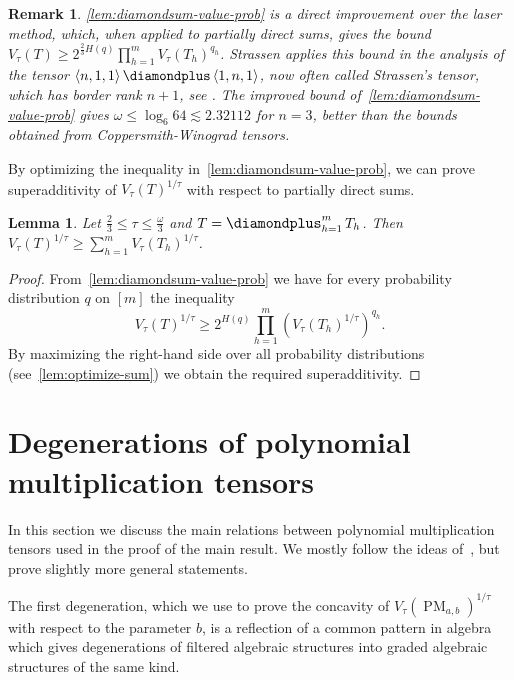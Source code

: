 \documentclass[11pt,letterpaper]{article}
\newtheorem{lemma}[theorem]{Lemma}\AddToHook{env/lemma/begin}{\crefalias{theorem}{lemma}}
\newtheorem{remark}[theorem]{Remark}\AddToHook{env/remark/begin}{\crefalias{theorem}{remark}}
\numberwithin{equation}{section}
\DeclareMathOperator*{\bigdiamondplus}{\scalerel*{\diamondplus}{\bigoplus}}
\DeclareMathOperator{\PM}{PM}
\begin{document}
\begin{remark}\label{rem:laser-comparison}
  \cref{lem:diamondsum-value-prob} is a direct improvement over the laser method, which, when applied to partially direct sums, gives the bound $V_\tau(T) \geq 2^{\frac23 H(q)} \prod_{h = 1}^{m} V_\tau(T_h)^{q_h}$.
  Strassen applies this bound in the analysis of the tensor $\left<n, 1, 1\right> \diamondplus \left<1, n, 1\right>$, now often called Strassen's tensor, which has border rank $n + 1$, see \cite[Lemma~7.4]{Strassen-87}.
  The improved bound of~\cref{lem:diamondsum-value-prob} gives $\omega \leq \log_6 64 \lesssim 2.32112$ for $n = 3$, better than the bounds obtained from Coppersmith-Winograd tensors.
\end{remark}

By optimizing the inequality in~\cref{lem:diamondsum-value-prob}, we can prove superadditivity of $V_\tau(T)^{1/\tau}$
with respect to partially direct sums.

\begin{lemma}\label{lem:value-diamondsum}
    Let $\frac23\leq \tau \leq \frac{\omega}{3}$ and $T = \bigdiamondplus_{h = 1}^{m} T_h$.
    Then $V_\tau(T)^{1/\tau} \geq \sum_{h = 1}^{m} V_\tau(T_h)^{1/\tau}$.
\end{lemma}
\begin{proof}
  From~\cref{lem:diamondsum-value-prob} we have for every probability distribution $q$ on $[m]$ the inequality
  \[ V_\tau(T)^{1/\tau} \geq 2^{H(q)} \prod_{h = 1}^{m} \left(V_\tau(T_h)^{1/\tau}\right)^{q_h}. \]
  By maximizing the right-hand side over all probability distributions (see~\cref{lem:optimize-sum}) we obtain the required superadditivity.
\end{proof}

\section{Degenerations of polynomial multiplication tensors}
\label{sec:degens}

In this section we discuss the main relations between polynomial multiplication tensors used in the proof of the main result. We mostly follow the ideas of~\cite{chatgpt-paper}, but prove slightly more general statements.

The first degeneration, which we use to prove the concavity of $V_\tau(\PM_{a, b})^{1/\tau}$ with respect to the parameter $b$, is a reflection of a common pattern in algebra which gives degenerations of filtered algebraic structures into graded algebraic structures of the same kind.
\end{document}
